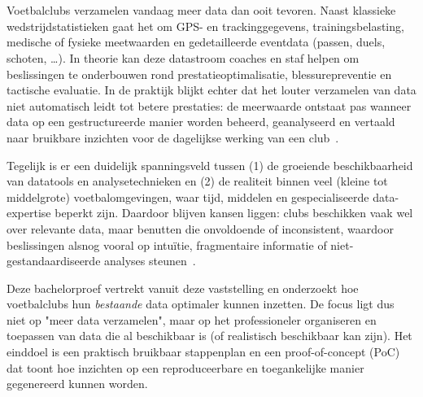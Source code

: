 
\chapter{}%
\label{ch:inleiding}

Voetbalclubs verzamelen vandaag meer data dan ooit tevoren. Naast klassieke wedstrijdstatistieken gaat het om GPS- en trackinggegevens, trainingsbelasting, medische of fysieke meetwaarden en gedetailleerde eventdata (passen, duels, schoten, \dots).
In theorie kan deze datastroom coaches en staf helpen om beslissingen te onderbouwen rond prestatieoptimalisatie, blessurepreventie en tactische evaluatie.
In de praktijk blijkt echter dat het louter verzamelen van data niet automatisch leidt tot betere prestaties: de meerwaarde ontstaat pas wanneer data op een gestructureerde manier worden beheerd, geanalyseerd en vertaald naar bruikbare inzichten voor de dagelijkse werking van een club~\autocite{Alamar2013}.

Tegelijk is er een duidelijk spanningsveld tussen (1) de groeiende beschikbaarheid van datatools en analysetechnieken en (2) de realiteit binnen veel (kleine tot middelgrote) voetbalomgevingen, waar tijd, middelen en gespecialiseerde data-expertise beperkt zijn.
Daardoor blijven kansen liggen: clubs beschikken vaak wel over relevante data, maar benutten die onvoldoende of inconsistent, waardoor beslissingen alsnog vooral op intuïtie, fragmentaire informatie of niet-gestandaardiseerde analyses steunen~\autocite{Rein2016}.

Deze bachelorproef vertrekt vanuit deze vaststelling en onderzoekt hoe voetbalclubs hun \emph{bestaande} data optimaler kunnen inzetten. De focus ligt dus niet op "meer data verzamelen", maar op het professioneler organiseren en toepassen van data die al beschikbaar is (of realistisch beschikbaar kan zijn).
Het einddoel is een praktisch bruikbaar stappenplan en een proof-of-concept (PoC) dat toont hoe inzichten op een reproduceerbare en toegankelijke manier gegenereerd kunnen worden.


